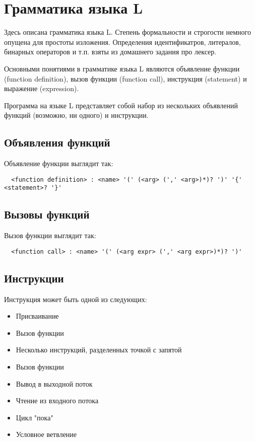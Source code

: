\documentclass{amsart}
\begin{document}
  \section{Грамматика языка L}

  Здесь описана грамматика языка L. Степень формальности и строгости немного опущена для простоты изложения.
  Определения идентификатров, литералов, бинарных операторов и т.п. взяты из домашнего задания про лексер.

  Основными понятиями в грамматике языка L являются объявление функции (function definition), вызов функции (function 
  call), инструкция (statement) и выражение (expression).

  Программа на языке L представляет собой набор из нескольких объявлений функций (возможно, ни одного) и инструкции.
    
  \subsection{Объявления функций}
  Объявление функции выглядит так:

  \begin{lstlisting}
  <function definition> : <name> '(' (<arg> (',' <arg>)*)? ')' '{' <statement>? '}'
  \end{lstlisting}

  \subsection{Вызовы функций}
  Вызов функции выглядит так:

  \begin{lstlisting}
  <function call> : <name> '(' (<arg expr> (',' <arg expr>)*)? ')'
  \end{lstlisting}


  \subsection{Инструкции}
  Инструкция может быть одной из следующих:

  \begin{itemize}
      \item Присваивание
      \item Вызов функции
      \item Несколько инструкций, разделенных точкой с запятой
      \item Вызов функции
      \item Вывод в выходной поток
      \item Чтение из входного потока
      \item Цикл "пока"
      \item Условное ветвление
  \end{itemize}
\end{document}
